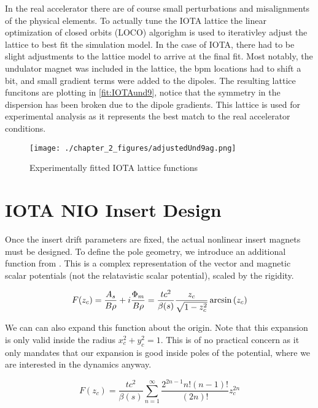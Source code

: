 In the real accelerator there are of course small perturbations and misalignments of the physical elements. To actually tune the IOTA lattice the linear optimization of closed orbits (LOCO) algorighm is used to iterativley adjust the lattice to best fit the simulation model. In the case of IOTA, there had to be slight adjustments to the lattice model to arrive at the final fit. Most notably, the undulator magnet was included in the lattice, the bpm locations had to shift a bit, and small gradient terms were added to the dipoles. The resulting lattice funcitons are plotting in \ref{fit:IOTAund9}, notice that the symmetry in the dispersion has been broken due to the dipole gradients. This lattice is used for experimental analysis as it represents the best match to the real accelerator conditions.

\begin{figure}
	\centering
	\texttt{[image: ./chapter\_2\_figures/adjustedUnd9ag.png]}
	\caption{Experimentally fitted IOTA lattice functions}
	\label{fig:IOTAund9}
\end{figure}


\section{IOTA NIO Insert Design} \label{sec:nioDesign}
Once the insert drift parameters are fixed, the actual nonlinear insert magnets must be designed. To define the pole geometry, we introduce an additional function from \cite{mitchellComplex}. This is a complex representation of the vector and magnetic scalar potentials (not the relatavistic scalar potential), scaled by the rigidity.

\begin{equation} \label{eq:genF}
	F(z_c) = \frac{A_s}{B\rho} + i\frac{\Phi_m}{B\rho} = \frac{t c^2}{\beta(s)}\frac{z_c}{\sqrt{1-z_c^2}} \arcsin{(z_c)} \\ 
\end{equation}

We can can also expand this function about the origin. Note that this expansion is only valid inside the radius $x_c^2 + y_c^2 = 1$. This is of no practical concern as it only mandates that our expansion is good inside poles of the potential, where we are interested in the dynamics anyway.

\begin{equation} \label{eq:powF}
	F(z_c) = \frac{t c^2}{\beta(s)} \sum_{n=1}^{\infty} \frac{2^{2n-1}n!(n-1)!}{(2n)!} z_c^{2n}
\end{equation}

